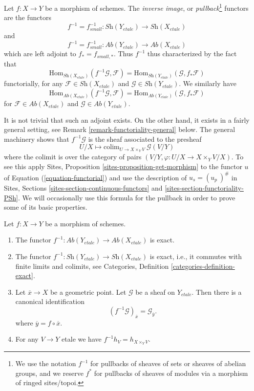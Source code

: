\begin{definition}
\label{definition-inverse-image}
Let $f: X\to Y$ be a morphism of schemes. The {\it inverse image}, or
{\it pullback}\footnote{We use the notation $f^{-1}$ for pullbacks of
sheaves of sets or sheaves of abelian groups, and we reserve $f^*$ for
pullbacks of sheaves of modules via a morphism of ringed sites/topoi.}
functors are the functors
$$
f^{-1} = f_{small}^{-1} :
\textit{Sh}(Y_{etale})
\longrightarrow
\textit{Sh}(X_{etale})
$$
and
$$
f^{-1} = f_{small}^{-1} :
\textit{Ab}(Y_{etale})
\longrightarrow
\textit{Ab}(X_{etale})
$$
which are left adjoint to $f_* = f_{small, *}$. Thus
$f^{-1}$ thus characterized by the fact that
$$
\text{Hom}_{{\textit{Sh}(X_{etale})}} (f^{-1}\mathcal{G}, \mathcal{F}) =
\text{Hom}_{\textit{Sh}(Y_{etale})} (\mathcal{G}, f_*\mathcal{F})
$$
functorially, for any $\mathcal{F} \in \textit{Sh}(X_{etale})$ and
$\mathcal{G} \in \textit{Sh}(Y_{etale})$. We similarly have
$$
\text{Hom}_{{\textit{Ab}(X_{etale})}} (f^{-1}\mathcal{G}, \mathcal{F}) =
\text{Hom}_{\textit{Ab}(Y_{etale})} (\mathcal{G}, f_*\mathcal{F})
$$
for $\mathcal{F} \in \textit{Ab}(X_{etale})$ and
$\mathcal{G} \in \textit{Ab}(Y_{etale})$.
\end{definition}

\noindent
It is not trivial that such an adjoint exists. 
On the other hand, it exists in a fairly general setting, see
Remark \ref{remark-functoriality-general}
below. The general machinery shows that $f^{-1}\mathcal{G}$
is the sheaf associated to the presheaf
\begin{equation}
\label{equation-pullback}
U/X
\longmapsto
\text{colim}_{U \to X \times_Y V}\ \mathcal{G}(V/Y)
\end{equation}
where the colimit is over the category of pairs
$(V/Y, \varphi : U/X \to X \times_Y V/X)$.
To see this apply
Sites, Proposition \ref{sites-proposition-get-morphism}
to the functor $u$ of Equation (\ref{equation-functorial})
and use the description of $u_s = (u_p\ )^\#$ in
Sites, Sections \ref{sites-section-continuous-functors} and
\ref{sites-section-functoriality-PSh}.
We will occasionally use this formula for the pullback
in order to prove some of its basic properties.

\begin{lemma}
\label{lemma-stalk-pullback}
Let $f : X \to Y$ be a morphism of schemes.
\begin{enumerate}
\item The functor
$f^{-1} : \textit{Ab}(Y_{etale}) \to \textit{Ab}(X_{etale})$ is exact.
\item The functor
$f^{-1} : \textit{Sh}(Y_{etale}) \to \textit{Sh}(X_{etale})$ is exact,
i.e., it commutes with finite limits and colimits, see
Categories, Definition \ref{categories-definition-exact}.
\item Let $\overline{x} \to X$ be a geometric point.
Let $\mathcal{G}$ be a sheaf on $Y_{etale}$.
Then there is a canonical identification
$$
(f^{-1}\mathcal{G})_{\overline{x}} = \mathcal{G}_{\overline{y}}.
$$
where $\overline{y} = f \circ \overline{x}$.
\item For any $V \to Y$ etale we have $f^{-1}h_V = h_{X \times_Y V}$.
\end{enumerate}
\end{lemma}

